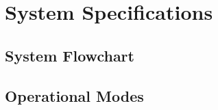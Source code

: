 \chapter{System Specifications}
\thispagestyle{fancy}


\section{System Flowchart}
\blindtext


\section{Operational Modes}
\blindtext
